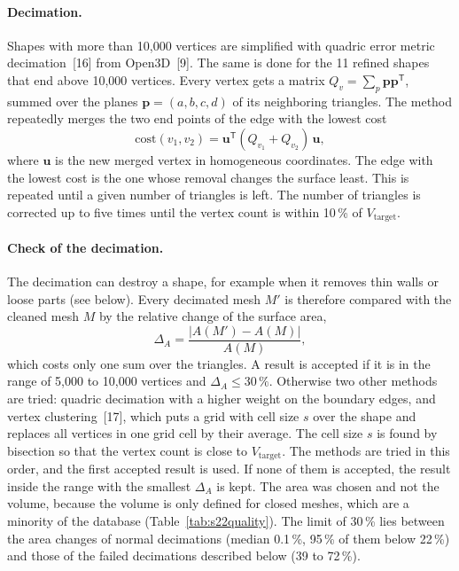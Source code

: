 \documentclass[10pt,a4paper]{article}
\begin{document}
\paragraph{Decimation.} Shapes with more than 10,000 vertices are simplified with quadric error metric decimation~[16] from
Open3D~[9]. The same is done for the 11 refined shapes that end above 10,000 vertices. Every vertex gets a matrix $Q_v=\sum_p \mathbf p\mathbf p^{\mathsf T}$, summed over the planes
$\mathbf p=(a,b,c,d)$ of its neighboring triangles. The method repeatedly merges the two end points of the edge with the lowest
cost
\begin{equation}
  \mathrm{cost}(v_1,v_2)=\mathbf u^{\mathsf T}(Q_{v_1}+Q_{v_2})\,\mathbf u,
  \label{eq:quadric}
\end{equation}
where $\mathbf u$ is the new merged vertex in homogeneous coordinates. The edge with the lowest cost is the one whose removal
changes the surface least.
This is repeated until a given number of triangles is left. The number of triangles is corrected up to five times until the vertex
count is within 10\,\% of $V_{\text{target}}$.

\paragraph{Check of the decimation.} The decimation can destroy a shape, for example when it removes thin walls or loose parts
(see below). Every decimated mesh $M'$ is therefore compared with the cleaned mesh $M$ by the relative change of the surface
area,
\begin{equation}
  \Delta_A=\frac{\lvert A(M')-A(M)\rvert}{A(M)},
  \label{eq:areachange}
\end{equation}
which costs only one sum over the triangles. A result is accepted if it is in the range of 5,000 to 10,000 vertices and
$\Delta_A\le 30\,\%$. Otherwise two other methods are tried: quadric decimation with a higher weight on the boundary edges, and
vertex clustering~[17], which puts a grid with cell size $s$ over the shape and replaces all vertices in one grid cell by their
average. The cell size $s$ is found by bisection so that the vertex count is close to $V_{\text{target}}$. The methods are tried
in this order, and the first accepted result is used. If none of them is accepted, the result inside the range with the smallest
$\Delta_A$ is kept. The area was chosen and not the volume, because the volume is only defined for closed meshes, which are a
minority of the database (Table~\ref{tab:s22quality}). The limit of 30\,\% lies between the area changes of normal decimations
(median 0.1\,\%, 95\,\% of them below 22\,\%) and those of the failed decimations described below (39 to 72\,\%).
\end{document}
